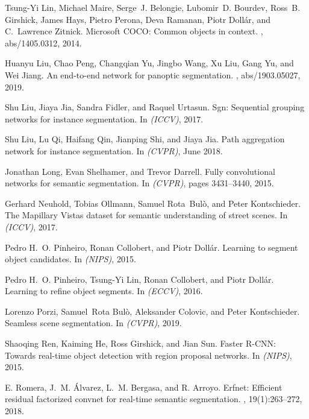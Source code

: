 \documentclass[10pt,twocolumn,letterpaper]{article}
\begin{document}
{\begin{thebibliography}{10}
Tsung{-}Yi Lin, Michael Maire, Serge~J. Belongie, Lubomir~D. Bourdev, Ross~B.
  Girshick, James Hays, Pietro Perona, Deva Ramanan, Piotr Doll{\'{a}}r, and
  C.~Lawrence Zitnick.
\newblock Microsoft {COCO:} {C}ommon objects in context.
, abs/1405.0312, 2014.

Huanyu Liu, Chao Peng, Changqian Yu, Jingbo Wang, Xu Liu, Gang Yu, and Wei
  Jiang.
\newblock An end-to-end network for panoptic segmentation.
, abs/1903.05027, 2019.

Shu Liu, Jiaya Jia, Sandra Fidler, and Raquel Urtasun.
\newblock Sgn: Sequential grouping networks for instance segmentation.
\newblock In {\em (ICCV)}, 2017.

Shu Liu, Lu Qi, Haifang Qin, Jianping Shi, and Jiaya Jia.
\newblock Path aggregation network for instance segmentation.
\newblock In {\em (CVPR)}, June 2018.

Jonathan Long, Evan Shelhamer, and Trevor Darrell.
\newblock Fully convolutional networks for semantic segmentation.
\newblock In {\em (CVPR)}, pages 3431--3440, 2015.

Gerhard Neuhold, Tobias Ollmann, Samuel Rota~Bul\`o, and Peter Kontschieder.
\newblock The {M}apillary {V}istas dataset for semantic understanding of street
  scenes.
\newblock In {\em (ICCV)}, 2017.

Pedro H.~O. Pinheiro, Ronan Collobert, and Piotr Doll{\'{a}}r.
\newblock Learning to segment object candidates.
\newblock In {\em (NIPS)}, 2015.

Pedro H.~O. Pinheiro, Tsung{-}Yi Lin, Ronan Collobert, and Piotr Doll{\'{a}}r.
\newblock Learning to refine object segments.
\newblock In {\em (ECCV)}, 2016.

Lorenzo Porzi, Samuel~Rota Bul\`o, Aleksander Colovic, and Peter Kontschieder.
\newblock Seamless scene segmentation.
\newblock In {\em (CVPR)}, 2019.

Shaoqing Ren, Kaiming He, Ross Girshick, and Jian Sun.
\newblock Faster {R-CNN}: Towards real-time object detection with region
  proposal networks.
\newblock In {\em (NIPS)}, 2015.

E. Romera, J.~M. Álvarez, L.~M. Bergasa, and R. Arroyo.
\newblock Erfnet: Efficient residual factorized convnet for real-time semantic
  segmentation.
,
  19(1):263--272, 2018.


\end{thebibliography}}
\end{document}
